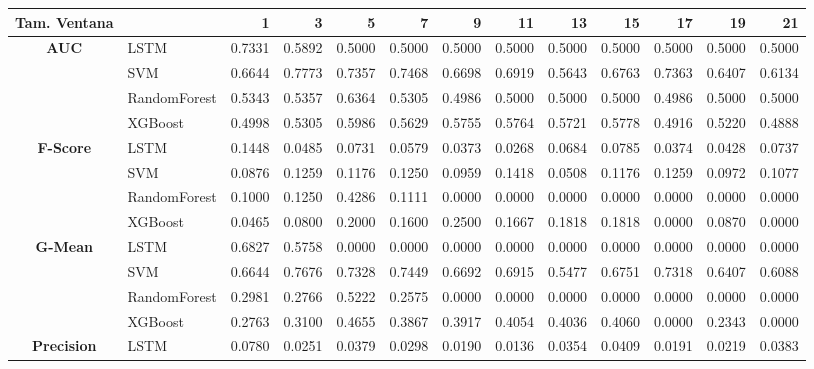 \begin{table}[h]
	\centering
	\begin{adjustbox}{max width=15cm}
		\begin{tabular}{|c|l|r|r|r|r|r|r|r|r|r|r|r|}
			\hline
			\textbf{Tam. Ventana} &         &      1  &      3  &      5  &      7  &      9  &      11 &      13 &      15 &      17 &      19 &      21 \\
			\hline
			\textbf{AUC} & LSTM &  0.7331 &  0.5892 &  0.5000 &  0.5000 &  0.5000 &  0.5000 &  0.5000 &  0.5000 &  0.5000 &  0.5000 &  0.5000 \\
			& SVM &  0.6644 &  0.7773 &  0.7357 &  0.7468 &  0.6698 &  0.6919 &  0.5643 &  0.6763 &  0.7363 &  0.6407 &  0.6134 \\
			& RandomForest &  0.5343 &  0.5357 &  0.6364 &  0.5305 &  0.4986 &  0.5000 &  0.5000 &  0.5000 &  0.4986 &  0.5000 &  0.5000 \\
			& XGBoost &  0.4998 &  0.5305 &  0.5986 &  0.5629 &  0.5755 &  0.5764 &  0.5721 &  0.5778 &  0.4916 &  0.5220 &  0.4888 \\
			\hline
			\textbf{F-Score} & LSTM &  0.1448 &  0.0485 &  0.0731 &  0.0579 &  0.0373 &  0.0268 &  0.0684 &  0.0785 &  0.0374 &  0.0428 &  0.0737 \\
			& SVM &  0.0876 &  0.1259 &  0.1176 &  0.1250 &  0.0959 &  0.1418 &  0.0508 &  0.1176 &  0.1259 &  0.0972 &  0.1077 \\
			& RandomForest &  0.1000 &  0.1250 &  0.4286 &  0.1111 &  0.0000 &  0.0000 &  0.0000 &  0.0000 &  0.0000 &  0.0000 &  0.0000 \\
			& XGBoost &  0.0465 &  0.0800 &  0.2000 &  0.1600 &  0.2500 &  0.1667 &  0.1818 &  0.1818 &  0.0000 &  0.0870 &  0.0000 \\
			\hline
			\textbf{G-Mean} & LSTM &  0.6827 &  0.5758 &  0.0000 &  0.0000 &  0.0000 &  0.0000 &  0.0000 &  0.0000 &  0.0000 &  0.0000 &  0.0000 \\
			& SVM &  0.6644 &  0.7676 &  0.7328 &  0.7449 &  0.6692 &  0.6915 &  0.5477 &  0.6751 &  0.7318 &  0.6407 &  0.6088 \\
			& RandomForest &  0.2981 &  0.2766 &  0.5222 &  0.2575 &  0.0000 &  0.0000 &  0.0000 &  0.0000 &  0.0000 &  0.0000 &  0.0000 \\
			& XGBoost &  0.2763 &  0.3100 &  0.4655 &  0.3867 &  0.3917 &  0.4054 &  0.4036 &  0.4060 &  0.0000 &  0.2343 &  0.0000 \\
			\hline
			\textbf{Precision} & LSTM &  0.0780 &  0.0251 &  0.0379 &  0.0298 &  0.0190 &  0.0136 &  0.0354 &  0.0409 &  0.0191 &  0.0219 &  0.0383 \\

\end{tabular}
\end{adjustbox}
\end{table}
